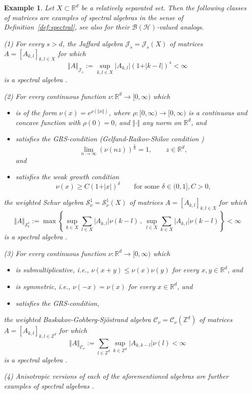 \documentclass{amsart}
\newtheorem{example}[theorem]{Example}
\def\Hil{\mathcal{H}}
\newcommand{\B}[0]{{\mathcal{B}}}
\newcommand{\J}[0]{{\mathcal{J}}}
\newcommand{\MS}[0]{{\mathcal{S}}}
\begin{document}
\begin{example}\label{spectralexamples}
Let $X\subset \mathbb{R}^d$ be a relatively separated set. Then the following classes of matrices are examples of spectral algebras in the sense of Definition~\ref{def:spectral}, see also \cite{KoeBa25} for their $\B(\Hil)$-valued analogs.

\noindent\emph{(1)} For every $s>d$, the \emph{Jaffard algebra} $\J_s = \J_s(X)$ of matrices $A = [A_{k,l}]_{k,l \in X}$ for which 
$$\Vert A \Vert_{\J_s} := \sup_{k,l\in X} \vert A_{k,l} \vert (1+\vert k-l \vert)^s < \infty$$
is a spectral algebra \cite{ja90}.

\noindent\emph{(2)} For every continuous function $\nu:\mathbb{R}^d\to [0,\infty)$ which
\begin{itemize}
    \item[(2a)] is of the form $\nu(x) = e^{\rho(\Vert x \Vert)}$, where $\rho:[0,\infty) \longrightarrow [0,\infty)$ is a continuous and concave function with $\rho(0) = 0$, and $\Vert   \cdot   \Vert$ any norm on $\mathbb{R}^d$, and
    \item[(2b)] satisfies the GRS-condition (Gelfand-Raikov-Shilov condition \cite{GRS64})
    $$\lim_{n\rightarrow \infty} (\nu(nz))^{\frac{1}{n}} = 1, \qquad z\in \mathbb{R}^{d},$$ and
    \item[(2c)] satisfies the weak growth condition \cite{groelei06,barnes87}
$$\nu(x) \geq C (1+\vert x \vert)^{\delta} \qquad \text{for some } \delta\in (0,1], C>0,$$
\end{itemize}
the weighted \emph{Schur algebra} $\MS^1_{\nu} = \MS^1_{\nu}(X)$ of matrices $A = [A_{k,l}]_{k,l \in X}$ for which
$$\Vert A \Vert_{\MS^1_{\nu}} := \max \left\lbrace \sup_{k\in X} \sum_{l\in X} \vert A_{k,l} \vert \nu(k-l) \, , \, \sup_{l\in X} \sum_{k\in X} \vert A_{k,l} \vert \nu(k-l)\right\rbrace < \infty$$
is a spectral algebra \cite{groelei06,sun}.

\noindent\emph{(3)} For every continuous function $\nu:\mathbb{R}^d\to [0,\infty)$ which
\begin{itemize}
    \item[(3a)] is \emph{submultiplicative}, i.e., $\nu(x+y)\leq \nu(x)\nu(y)$ for every $x,y\in \mathbb{R}^d$, and
    \item[(3b)] is \emph{symmetric}, i.e., $\nu(-x) = \nu(x)$ for every  $x\in \mathbb{R}^d$, and
    \item[(3c)] satisfies the GRS-condition,
\end{itemize}
the weighted \emph{Baskakov-Gohberg-Sj\"ostrand algebra} $\mathcal{C}_{\nu} = \mathcal{C}_{\nu}(\mathbb{Z}^d)$ of matrices $A=[A_{k,l}]_{k,l\in \mathbb{Z}^d}$ for which
$$\Vert A \Vert_{\mathcal{C}_\nu} := \sum_{l\in \mathbb{Z}^d} \sup_{k\in \mathbb{Z}^d} \vert A_{k,k-l} \vert \nu(l) <\infty$$
is a spectral algebra \cite{Baskakov1990,Gohberg89,Sjostrand19941995}.

\noindent\emph{(4)} Anisotropic versions of each of the aforementioned algebras are further examples of spectral algebras \cite[Section~6]{KoeBa25}.
\end{example}  
\end{document}

